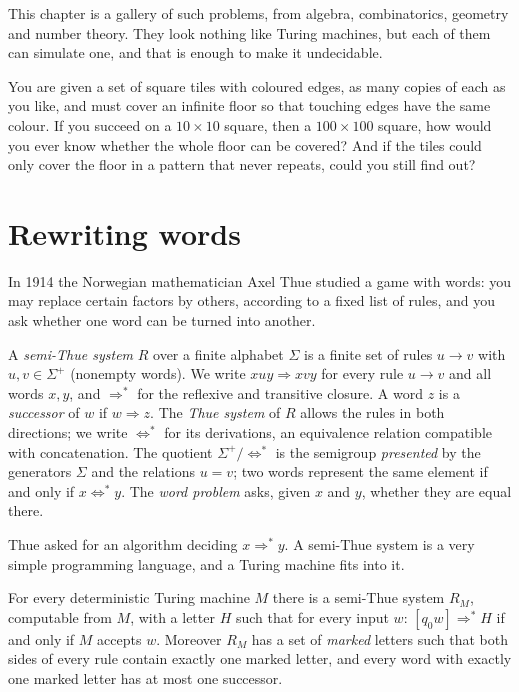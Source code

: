 This chapter is a gallery of such problems, from algebra, combinatorics, geometry and number theory. They look nothing like Turing machines, but each of them can simulate one, and that is enough to make it undecidable.

\begin{think}
You are given a set of square tiles with coloured edges, as many copies of each as you like, and must cover an infinite floor so that touching edges have the same colour. If you succeed on a $10\times10$ square, then a $100\times100$ square, how would you ever know whether the whole floor can be covered? And if the tiles could only cover the floor in a pattern that never repeats, could you still find out?
\end{think}

\section{Rewriting words}\label{sec:thue}

In 1914 the Norwegian mathematician Axel Thue studied a game with words: you may replace certain factors by others, according to a fixed list of rules, and you ask whether one word can be turned into another.

\begin{definition}\label{def:semithue}
A \emph{semi-Thue system} $R$ over a finite alphabet $\Sigma$ is a finite set of rules $u\to v$ with $u,v\in\Sigma^+$ (nonempty words). We write $xuy\Rightarrow xvy$ for every rule $u\to v$ and all words $x,y$, and $\Rightarrow^*$ for the reflexive and transitive closure. A word $z$ is a \emph{successor} of $w$ if $w\Rightarrow z$. The \emph{Thue system} of $R$ allows the rules in both directions; we write $\Leftrightarrow^*$ for its derivations, an equivalence relation compatible with concatenation. The quotient $\Sigma^+/\Leftrightarrow^*$ is the semigroup \emph{presented} by the generators $\Sigma$ and the relations $u=v$; two words represent the same element if and only if $x\Leftrightarrow^*y$. The \emph{word problem} asks, given $x$ and $y$, whether they are equal there.
\end{definition}

Thue asked for an algorithm deciding $x\Rightarrow^*y$. A semi-Thue system is a very simple programming language, and a Turing machine fits into it.

\begin{theorem}\label{thm:semithue}
For every deterministic Turing machine $M$ there is a semi-Thue system $R_M$, computable from $M$, with a letter $H$ such that for every input $w$: $[q_0w]\Rightarrow^*H$ if and only if $M$ accepts $w$. Moreover $R_M$ has a set of \emph{marked} letters such that both sides of every rule contain exactly one marked letter, and every word with exactly one marked letter has at most one successor.
\end{theorem}

